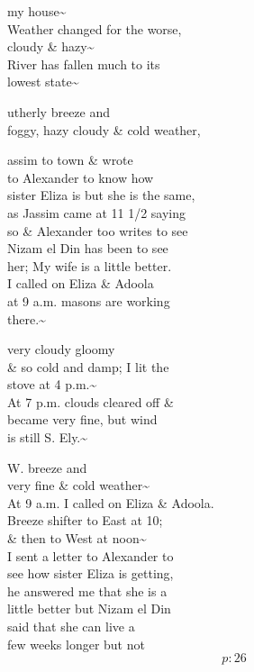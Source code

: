 \documentclass{report}
\begin{document}





	\par{
 	my house\~{}\ \\Weather changed for the worse,\ \\cloudy \& hazy\~{}\ \\River has fallen much to its\ \\lowest state\~{}\ \\
	}


	\par{
 	utherly breeze and\ \\foggy, hazy cloudy \& cold weather,\ \\
	}

	\par{
 	assim to town \& wrote\ \\to Alexander to know how\ \\sister Eliza is but she is the same,\ \\as Jassim came at 11 1/2 saying\ \\so \& Alexander too writes to see\ \\Nizam el Din has been to see\ \\her; My wife is a little better.\ \\I called on Eliza \& Adoola\ \\at 9 a.m. masons are working\ \\there.\~{}\ \\
	}

	\par{
 	very cloudy gloomy\ \\\& so cold and damp; I lit the\ \\stove at 4 p.m.\~{}\ \\At 7 p.m. clouds cleared off \&\ \\became very fine, but wind\ \\is still S. Ely.\~{}\ \\
	}


	\par{
 	W. breeze and\ \\very fine \& cold weather\~{}\ \\At 9 a.m. I called on Eliza \& Adoola.\ \\Breeze shifter to East at 10;\ \\\& then to West at noon\~{}\ \\I sent a letter to Alexander to\ \\see how sister Eliza is getting,\ \\he answered me that she is a\ \\little better but Nizam el Din\ \\said that she can live a\ \\few weeks longer but not\ \\
  \[p: 26 \]

	}
\end{document}
